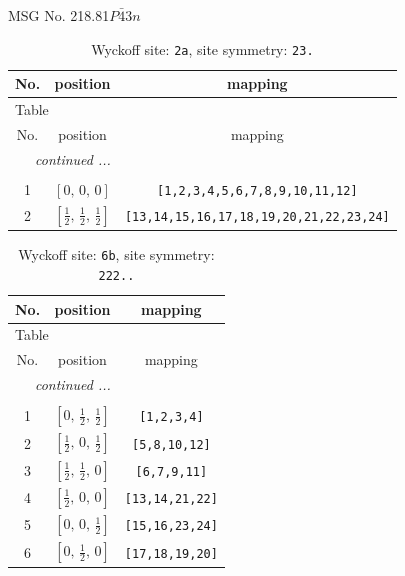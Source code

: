 \documentclass[fleqn,8pt]{jsarticle}
\begin{document}
\setcounter{MaxMatrixCols}{32}

\renewcommand{\tablename}{Table~}
\renewcommand{\figurename}{Figure~}
\begin{center}
\LARGE
MSG No. 218.81\quad$P\bar{4}3n$
\end{center}
\renewcommand{\arraystretch}{1.2}
\begin{longtable}{ccc}
\caption{Wyckoff site: {\tt 2a}, site symmetry: {\tt 23.}}
 \\
 \hline \hline
No. & position & mapping \\ \hline \endfirsthead

\multicolumn{2}{l}{\tablename\ \thetable{}} \\
 \hline \hline
No. & position & mapping \\ \hline \endhead

 \hline \hline
\multicolumn{2}{r}{\footnotesize\it continued ...} \\ \endfoot

 \hline \hline
\multicolumn{2}{r}{} \\ \endlastfoot

1 & $\left[ 0,\, 0,\, 0 \right]$ & {\tt [1,2,3,4,5,6,7,8,9,10,11,12]} \\ \hline
2 & $\left[ \frac{1}{2},\, \frac{1}{2},\, \frac{1}{2} \right]$ & {\tt [13,14,15,16,17,18,19,20,21,22,23,24]} \\
\end{longtable}
\renewcommand{\arraystretch}{1.2}
\begin{longtable}{ccc}
\caption{Wyckoff site: {\tt 6b}, site symmetry: {\tt 222..}}
 \\
 \hline \hline
No. & position & mapping \\ \hline \endfirsthead

\multicolumn{2}{l}{\tablename\ \thetable{}} \\
 \hline \hline
No. & position & mapping \\ \hline \endhead

 \hline \hline
\multicolumn{2}{r}{\footnotesize\it continued ...} \\ \endfoot

 \hline \hline
\multicolumn{2}{r}{} \\ \endlastfoot

1 & $\left[ 0,\, \frac{1}{2},\, \frac{1}{2} \right]$ & {\tt [1,2,3,4]} \\ \hline
2 & $\left[ \frac{1}{2},\, 0,\, \frac{1}{2} \right]$ & {\tt [5,8,10,12]} \\ \hline
3 & $\left[ \frac{1}{2},\, \frac{1}{2},\, 0 \right]$ & {\tt [6,7,9,11]} \\ \hline
4 & $\left[ \frac{1}{2},\, 0,\, 0 \right]$ & {\tt [13,14,21,22]} \\ \hline
5 & $\left[ 0,\, 0,\, \frac{1}{2} \right]$ & {\tt [15,16,23,24]} \\ \hline
6 & $\left[ 0,\, \frac{1}{2},\, 0 \right]$ & {\tt [17,18,19,20]} \\
\end{longtable}
\end{document}
